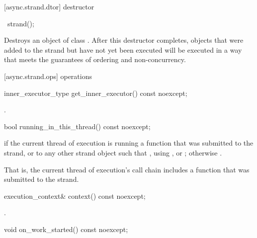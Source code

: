 [async.strand.dtor]{ destructor}

\begin{itemdecl}
~strand();
\end{itemdecl}

\begin{itemdescr}
\pnum
\effects Destroys an object of class . After this destructor completes, objects that were added to the strand but have not yet been executed will be executed in a way that meets the guarantees of ordering and non-concurrency.
\end{itemdescr}



[async.strand.ops]{ operations}

\begin{itemdecl}
inner_executor_type get_inner_executor() const noexcept;
\end{itemdecl}

\begin{itemdescr}
\pnum
\returns {}.
\end{itemdescr}

\begin{itemdecl}
bool running_in_this_thread() const noexcept;
\end{itemdecl}

\begin{itemdescr}
\pnum
\returns {} if the current thread of execution is running a function that was submitted to the strand, or to any other strand object  such that , using ,  or ; otherwise . \begin{note} That is, the current thread of execution's call chain includes a function that was submitted to the strand. \end{note}
\end{itemdescr}

\begin{itemdecl}
execution_context& context() const noexcept;
\end{itemdecl}

\begin{itemdescr}
\pnum
\returns {}.
\end{itemdescr}

\begin{itemdecl}
void on_work_started() const noexcept;
\end{itemdecl}


